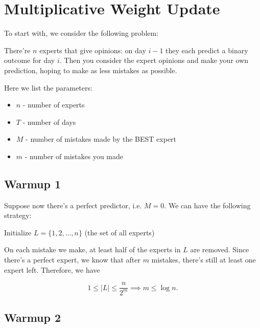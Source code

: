 \chapter{Multiplicative Weight Update}

To start with, we consider the following problem:

\begin{problem}

There're $n$ experts that give opinions: on day $i-1$ they each predict a binary outcome for day $i$. Then you consider the expert opinions and make your own prediction, hoping to make as less mistakes as possible.

\end{problem}

Here we list the parameters:

\begin{itemize}
	\item $n$ - number of experts
	\item $T$ - number of days
	\item $M$ - number of mistakes made by the BEST expert
	\item $m$ - number of mistakes you made
\end{itemize}


\section{Warmup 1}

Suppose now there's a perfect predictor, i.e. $M=0$. We can have the following strategy:

\begin{algorithm}
	\caption{Perfect Expert Algorithm}
	\label{alg:perfect-expert}
	Initialize $L = \{1, 2, \ldots, n\}$ (the set of all experts)\;
\end{algorithm}

On each mistake we make, at least half of the experts in $L$ are removed. Since there's a perfect expert, we know that after $m$ mistakes, there's still at least one expert left. Therefore, we have

\[ 1\leq |L| \leq \frac{n}{2^m} \implies m \leq \log n. \]

\section{Warmup 2}

